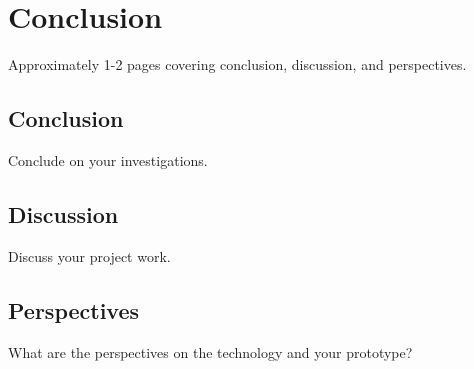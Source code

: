 \chapter{Conclusion}
Approximately 1-2 pages covering conclusion, discussion, and perspectives.
\section{Conclusion}
Conclude on your investigations.
\section{Discussion}
Discuss your project work.
\section{Perspectives}
What are the perspectives on the technology and your prototype? 